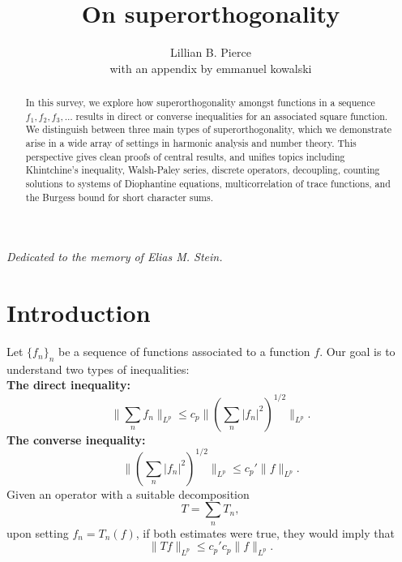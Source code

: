 \documentclass[oneside,11pt]{amsart}
\begin{document}
\title[On superorthogonality]{On superorthogonality}



\author[Pierce]{Lillian B. Pierce\\$\quad$\\ \MakeLowercase{with an appendix by \uppercase{E}mmanuel \uppercase{K}owalski}}
\address{Department of Mathematics, Duke University, 120 Science Drive, Durham NC 27708 USA }






%
	\begin{abstract}
  In this survey, we explore how superorthogonality amongst functions in a sequence $f_1,f_2,f_3,\ldots$ results in direct or converse inequalities for an associated square function.  We distinguish between three main types of superorthogonality, which we demonstrate arise in a wide array of settings in harmonic analysis and number theory. This perspective gives clean proofs of central results, and unifies topics including Khintchine's inequality, Walsh-Paley series, discrete operators, decoupling, counting solutions to systems of Diophantine equations, multicorrelation of trace functions, and the Burgess bound for short character sums. 
	\end{abstract}


\maketitle 

\begin{center}
\emph{Dedicated to the memory of Elias M. Stein.}
\end{center}
 

 

 \section{Introduction}\label{sec_superorthog}

Let $\{f_n\}_n$ be a sequence of functions associated to a function $f$. Our goal is to understand two types of inequalities:
\\ 
{\bf The direct inequality:}
\[
\| \sum_n f_n \|_{L^p} \leq c_p \| ( \sum_n |f_n|^2)^{1/2} \|_{L^p}.
\]
{\bf The converse inequality:}
\[
 \| ( \sum_n |f_n|^2)^{1/2} \|_{L^p} \leq {c_p}' \| f\|_{L^p}.
\]
Given an operator with a suitable   decomposition
\[ T  = \sum_n T_n,\]
upon setting $f_n = T_n(f)$, 
if both estimates were true, they would imply that
\[ \| Tf \|_{L^p} \leq  {c_p}' c_p\| f\|_{L^p} .
\]
\end{document}
